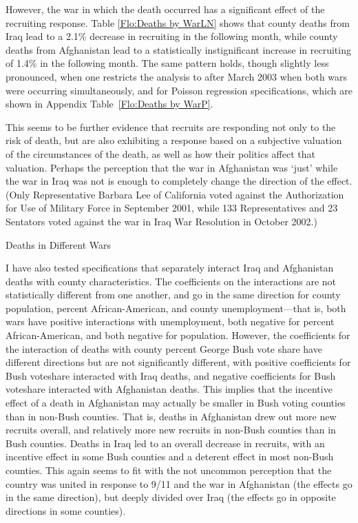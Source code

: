 \documentclass[12pt] {article}
\begin{document}
However, the war in which the death occurred has a significant effect of the recruiting response. Table \ref{Flo:Deaths by WarLN} shows that county deaths from Iraq lead to a 2.1\% decrease in recruiting in the following month, while county deaths from Afghanistan lead to a statistically instignificant increase in recruiting of 1.4\% in the following month. The same pattern holds, though slightly less pronounced, when one restricts the analysis to after March 2003 when both wars were occurring simultaneously, and for Poisson regression specifications, which are shown in Appendix Table~\ref{Flo:Deaths by WarP}. 

This seems to be further evidence that recruits are responding not only to the risk of death, but are also exhibiting a response based on a subjective valuation of the circumstances of the death, as well as how their politics affect that valuation. Perhaps the perception that the war in Afghanistan was `just' while the war in Iraq was not is enough to completely change the direction of the effect. (Only Representative Barbara Lee of California voted against the Authorization for Use of Military Force in September 2001, while 133 Representatives and 23 Sentators voted against the war in Iraq War Resolution in October 2002.)
\begin{table}
\caption{Deaths in Different Wars}
\label{Flo:Deaths by WarLN}
\scalebox{0.8}{

}
\end{table}


I have also tested specifications that separately interact Iraq and Afghanistan deaths with county characteristics. The coefficients on the interactions are not statistically different from one another, and go in the same direction for county population, percent African-American, and county unemployment---that is, both wars have positive interactions with unemployment, both negative for percent African-American, and both negative for population. However, the coefficients for the interaction of deaths with county percent George Bush vote share have different directions but are not significantly different, with positive coefficients for Bush voteshare interacted with Iraq deaths, and negative coefficients for Bush voteshare interacted with Afghanistan deaths. This implies that the incentive effect of a death in Afghanistan may actually be smaller in Bush voting counties than in non-Bush counties. That is, deaths in Afghanistan drew out more new recruits overall, and relatively more new recruits in non-Bush counties than in Bush counties. Deaths in Iraq led to an overall decrease in recruits, with an incentive effect in some Bush counties and a deterent effect in most non-Bush counties. This again seems to fit with the not uncommon perception that the country was united in response to 9/11 and the war in Afghanistan (the effects go in the same direction), but deeply divided over Iraq (the effects go in opposite directions in some counties). 
\end{document}
